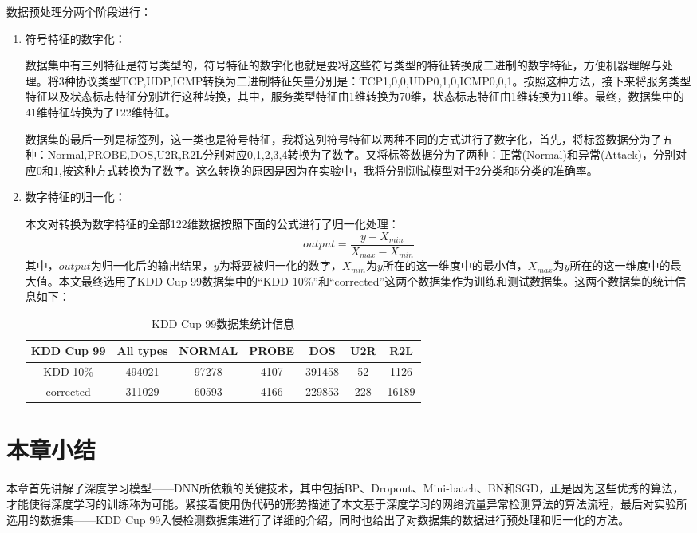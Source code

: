 数据预处理分两个阶段进行：
\begin{enumerate}
    \item 符号特征的数字化：

    数据集中有三列特征是符号类型的，符号特征的数字化也就是要将这些符号类型的特征转换成二进制的数字特征，方便机器理解与处理。将3种协议类型TCP,UDP,ICMP转换为二进制特征矢量分别是：TCP{1,0,0},UDP{0,1,0},ICMP{0,0,1}。按照这种方法，接下来将服务类型特征以及状态标志特征分别进行这种转换，其中，服务类型特征由1维转换为70维，状态标志特征由1维转换为11维。最终，数据集中的41维特征转换为了122维特征。

    数据集的最后一列是标签列，这一类也是符号特征，我将这列符号特征以两种不同的方式进行了数字化，首先，将标签数据分为了五种：Normal,PROBE,DOS,U2R,R2L分别对应0,1,2,3,4转换为了数字。又将标签数据分为了两种：正常(Normal)和异常(Attack)，分别对应0和1,按这种方式转换为了数字。这么转换的原因是因为在实验中，我将分别测试模型对于2分类和5分类的准确率。

    \item 数字特征的归一化：

    本文对转换为数字特征的全部122维数据按照下面的公式进行了归一化处理：
    \begin{equation}
        output = \frac{y - X_{min}}{X_{max} - X_{min}}
    \end{equation}
    其中，$output$为归一化后的输出结果，$y$为将要被归一化的数字，$X_{min}$为$y$所在的这一维度中的最小值，$X_{max}$为$y$所在的这一维度中的最大值。本文最终选用了KDD Cup 99数据集中的“KDD 10\%”和“corrected”这两个数据集作为训练和测试数据集。这两个数据集的统计信息如下：
    \begin{table}[htbp]
        \centering
        \caption{KDD Cup 99数据集统计信息}
        \begin{tabular}{c|c|c|c|c|c|c}
            \toprule
            KDD Cup 99 & All types & NORMAL & PROBE & DOS    & U2R & R2L   \\
            \midrule
            KDD 10\%   & 494021    & 97278  & 4107  & 391458 & 52  & 1126  \\
            \midrule
            corrected  & 311029    & 60593  & 4166  & 229853 & 228 & 16189 \\
            \bottomrule
        \end{tabular}%
        \label{tab:kdd-dataset-info}%
    \end{table}%
\end{enumerate}

\section{本章小结}

本章首先讲解了深度学习模型——DNN所依赖的关键技术，其中包括BP、Dropout、Mini-batch、BN和SGD，正是因为这些优秀的算法，才能使得深度学习的训练称为可能。紧接着使用伪代码的形势描述了本文基于深度学习的网络流量异常检测算法的算法流程，最后对实验所选用的数据集——KDD Cup 99入侵检测数据集进行了详细的介绍，同时也给出了对数据集的数据进行预处理和归一化的方法。
